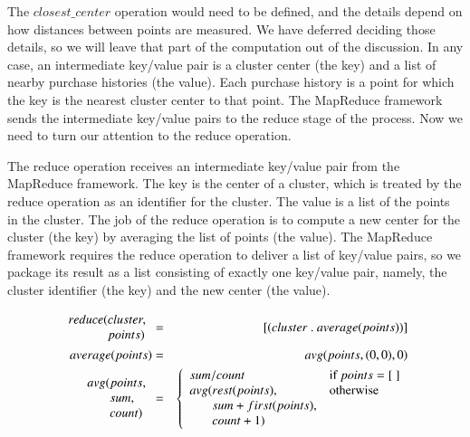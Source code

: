The $closest\_center$ operation would need to be defined,
and the details depend on how distances between
points are measured. We have deferred deciding those
details, so we will leave that part of the computation
out of the discussion.
In any case, an intermediate key/value pair is a cluster center
(the key) and a list of nearby purchase histories
(the value). Each purchase history is a point for which the
key is the nearest cluster center to that point.
The MapReduce framework sends the intermediate key/value pairs
to the reduce stage of the process.
Now we need to turn our attention to the reduce operation.

The reduce operation receives
an intermediate key/value pair from the MapReduce framework.
The key is the center of a cluster, which is treated by the reduce operation
as an identifier for the cluster.
The value is a list of the points in the cluster.
The job of the reduce operation is to compute a new
center for the cluster (the key) by averaging the list of points (the value).
The MapReduce framework requires the reduce operation to deliver
a list of key/value pairs, so we package its result as a list consisting
of exactly one key/value pair, namely, the cluster identifier (the key) and the
new center (the value).
\begin{spacing}{0.9}
\begin{eqnarray*}
    \begin{array}{l@{}l}
        reduce(&cluster, \\
               &points)
    \end{array} &=& [ ( cluster ~.~ average(points) ) ] \\
average(points) &=& avg(points, (0,0), 0) \\
\begin{array}{l@{}l}
    avg(&points, \\
        &sum, \\
        &count)
\end{array} &=&
    \left\{
        \begin{array}{l@{}ll}
            \multicolumn{2}{l}{sum / count} & \mbox{if } points = [~] \\
            avg(& rest(points),             & \mbox{otherwise} \\
                & sum+first(points),        & \\
                & count+1)                  & \\
        \end{array}
    \right.
\end{eqnarray*}
\end{spacing}

